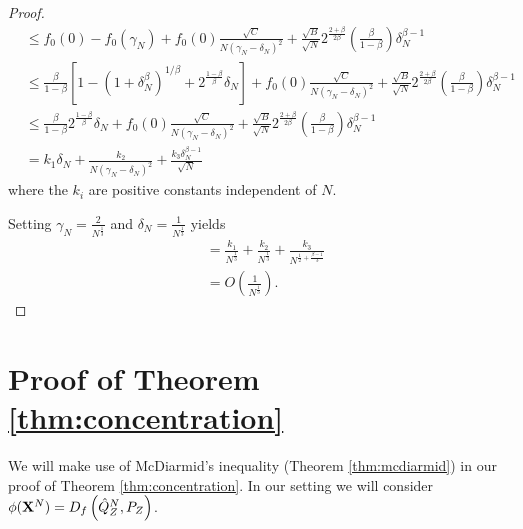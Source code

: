 \begin{proof}
\begin{align*}
    &\leq f_0(0) - f_0(\gamma_N) + f_0(0) \frac{\sqrt{C}}{N \left( \gamma_N - \delta_N \right)^2} + \frac{\sqrt{B}}{\sqrt{N}}2^{\frac{2+\beta}{2\beta}}\left(\frac{\beta}{1-\beta}\right) \delta_N^{\beta - 1}\\
    &\leq \frac{\beta}{1-\beta}\left[1 - \left(1+\delta_N^\beta\right)^{1/\beta} + 2^{\frac{1-\beta}{\beta}}\delta_N\right] + f_0(0) \frac{\sqrt{C}}{N \left( \gamma_N - \delta_N \right)^2} + \frac{\sqrt{B}}{\sqrt{N}}2^{\frac{2+\beta}{2\beta}}\left(\frac{\beta}{1-\beta}\right) \delta_N^{\beta - 1}\\
    &\leq \frac{\beta}{1-\beta} 2^{\frac{1-\beta}{\beta}}\delta_N + f_0(0) \frac{\sqrt{C}}{N \left( \gamma_N - \delta_N \right)^2}  + \frac{\sqrt{B}}{\sqrt{N}}2^{\frac{2+\beta}{2\beta}}\left(\frac{\beta}{1-\beta}\right) \delta_N^{\beta - 1}\\
    &= k_1 \delta_N + \frac{k_2}{N(\gamma_N - \delta_N)^2} + \frac{k_3\delta_N^{\beta-1}}{\sqrt{N}}
\end{align*}
where the $k_i$ are positive constants independent of $N$.

Setting $\gamma_N = \frac{2}{N^\frac{1}{3}}$ and $\delta_N = \frac{1}{N^\frac{1}{3}}$ yields
%
\begin{align*}
    &= \frac{k_1}{N^{\frac{1}{3}}}
    + \frac{k_2}{N^{\frac{1}{3}}} 
    + \frac{k_3}{N^{\frac{1}{2}+\frac{\beta-1}{3}}} \\
    &= O\left(\frac{1}{N^\frac{1}{3}}\right).
\end{align*}

\end{proof}

\section{Proof of Theorem \ref{thm:concentration}}\label{proof:thm3}

We will make use of McDiarmid's inequality (Theorem \ref{thm:mcdiarmid}) in our proof of Theorem \ref{thm:concentration}.
In our setting we will consider $\phi(\mathbf{X}^N) = D_f\left( \hat{Q}_Z^N , P_Z\right)$.


